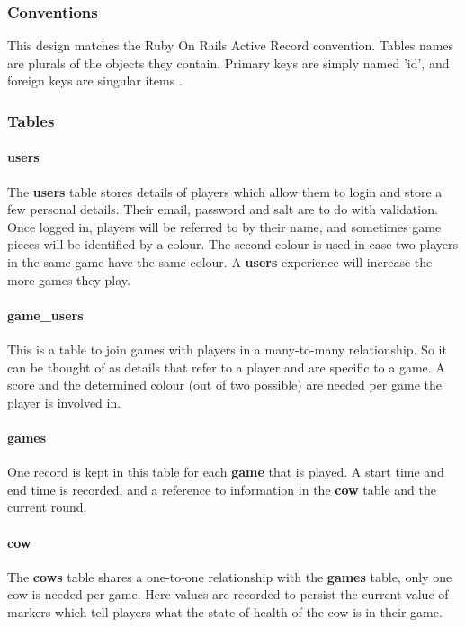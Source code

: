 \subsubsection{Conventions}
This design matches the Ruby On Rails Active Record convention. Tables names are plurals of the objects they contain. Primary keys are simply named 'id', and foreign keys are singular items \cite{ActiveRecordConvention}.

\subsubsection{Tables}
\paragraph{users} The \textbf{users} table stores details of players which allow them to login and store a few personal details. Their email, password and salt are to do with validation. Once logged in, players will be referred to by their name, and sometimes game pieces will be identified by a colour. The second colour is used in case two players in the same game have the same colour. A \textbf{users} experience will increase the more games they play.

\paragraph{game\_users} This is a table to join games with players in a many-to-many relationship. So it can be thought of as details that refer to a player and are specific to a game. A score and the determined colour (out of two possible) are needed per game the player is involved in.

\paragraph{games} One record is kept in this table for each \textbf{game} that is played. A start time and end time is recorded, and a reference to information in the \textbf{cow} table and the current round.

\paragraph{cow} The \textbf{cows} table shares a one-to-one relationship with the \textbf{games} table, only one cow is needed per game. Here values are recorded to persist the current value of markers which tell players what the state of health of the cow is in their game.

